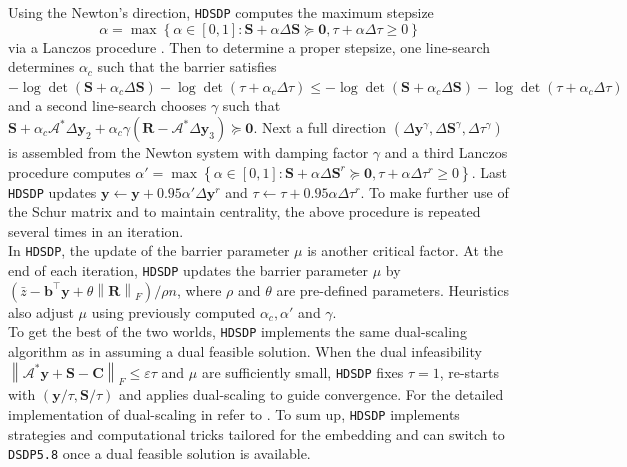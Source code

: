 \documentclass[10pt]{article}
\begin{document}
{Using the Newton's direction, {{\texttt{HDSDP}}} computes the maximum stepsize
$$\alpha = \max \left\{ \alpha \in [0, 1] : \mathbf{S} + \alpha \Delta \mathbf{S} \succeq \textbf{0},
\tau + \alpha \Delta \tau \geq 0 \right\}$$ via a Lanczos procedure
{\cite{toh2002note}}. Then to determine a proper stepsize, one line-search
determines $\alpha_c$ such that the barrier satisfies $- \log \det \left( \mathbf{S}
+ \alpha_c \Delta \mathbf{S} \right) - \log \det (\tau + \alpha_c \Delta \tau) \leq -
\log \det \left( \mathbf{S} + \alpha_c \Delta \mathbf{S} \right) - \log \det (\tau +
\alpha_c \Delta \tau)$ and a second line-search chooses $\gamma$ such that $\mathbf{S}
+ \alpha_c \mathcal{A}^{\ast} \Delta \mathbf{y}_2 + \alpha_c \gamma \left( \mathbf{R}
-\mathcal{A}^{\ast} \Delta \mathbf{y}_3 \right) \succeq \textbf{0}$. Next a full direction
$\left( \Delta \mathbf{y}^{\gamma}, \Delta \mathbf{S}^{\gamma}, \Delta \tau^{\gamma} \right)$
is assembled from the Newton system with damping factor $\gamma$ and
a third Lanczos procedure computes $\alpha' = \max \left\{ \alpha \in [0, 1] :
\mathbf{S} + \alpha \Delta \mathbf{S}^r \succeq \textbf{0}, \tau + \alpha \Delta \tau^r \geq 0
\right\}$. Last {{\texttt{HDSDP}}} updates $\mathbf{y} \leftarrow \mathbf{y} + 0.95 \alpha'
\Delta \mathbf{y}^r$ and $\tau \leftarrow \tau + 0.95 \alpha \Delta \tau^r$. To make
further use of the Schur matrix and to maintain centrality, the
above procedure is repeated several times in an iteration. \\

In {{\texttt{HDSDP}}}, the update of the barrier parameter $\mu$ is another
critical factor. At the end of each iteration, {{\texttt{HDSDP}}} updates the
barrier parameter $\mu$ by $\left( \bar{z} - \mathbf{b}^{\top} \mathbf{y} + \theta \left\|
\mathbf{R} \right\|_F \right) / \rho n$, where $\rho$ and $\theta$ are pre-defined
parameters. Heuristics also adjust $\mu$ using  previously computed $\alpha_c, \alpha'$ and $\gamma$. \\

To get the best of the two worlds, {{\texttt{HDSDP}}} implements the same
dual-scaling algorithm as in  assuming a dual feasible solution. 
When the dual infeasibility
$\left\| \mathcal{A}^{\ast} \mathbf{y} + \mathbf{S} - \mathbf{C} \right\|_F \leq \varepsilon \tau$ and $\mu$
are sufficiently small, {{\texttt{HDSDP}}} fixes $\tau = 1$, re-starts with
$\left( \mathbf{y} / \tau, \mathbf{S} / \tau \right)$ and applies dual-scaling to guide
convergence. For the detailed implementation of dual-scaling in
 refer to {\cite{benson2008algorithm}}. To sum up,
{{\texttt{HDSDP}}} implements strategies and computational tricks tailored for
the embedding and can switch to {{\texttt{DSDP5.8}}} once a dual feasible solution is available.

}
\end{document}
